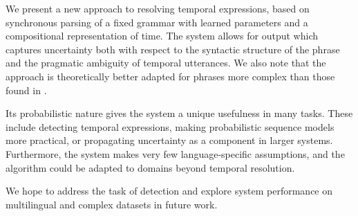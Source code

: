 We present a new approach to resolving temporal expressions,
	based on synchronous parsing of a fixed grammar with learned parameters
	and a compositional representation of time.
The system allows for output which captures uncertainty both with respect to 
	the syntactic structure of the phrase and the pragmatic ambiguity of 
	temporal utterances.
We also note that the approach is theoretically better adapted for
	phrases more complex than those found in \tempeval.

Its probabilistic nature gives the system a unique usefulness
	in many tasks.
These include detecting temporal expressions, making probabilistic
	sequence models more practical, or propagating uncertainty as a
	component in larger systems.
Furthermore, the system makes very few language-specific assumptions,
	and the algorithm could be adapted to domains beyond temporal resolution.

We hope to address the task of detection and explore system performance
	on multilingual and complex datasets in future work.
